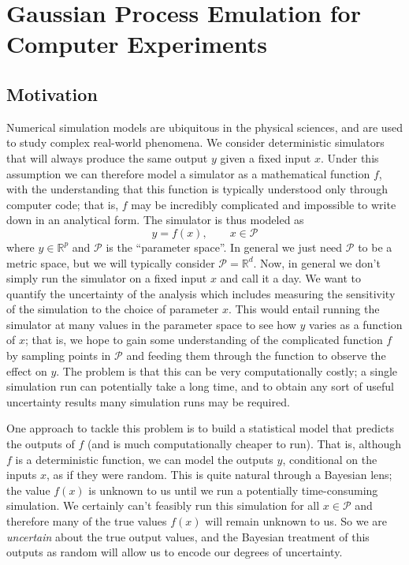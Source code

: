 \documentclass[12pt]{article}
\newcommand{\R}{\mathcal{R}}
\def\R{\mathbb{R}}
\begin{document}
\section{Gaussian Process Emulation for Computer Experiments}

\subsection{Motivation}
Numerical simulation models are ubiquitous in the physical sciences, and are used to study complex real-world phenomena. We consider 
deterministic simulators that will always produce the same output $y$ given a fixed input $x$. Under this assumption we can therefore model 
a simulator as a mathematical function $f$, with the understanding that this function is typically understood only through computer code; that is, 
$f$ may be incredibly complicated and impossible to write down in an analytical form. The simulator is thus modeled as 
\[y = f(x), \qquad x \in \mathcal{P}\]
where $y \in \R^p$ and $\mathcal{P}$ is the ``parameter space''. In general we just need $\mathcal{P}$ to be a metric space, but we will typically 
consider $\mathcal{P} = \R^d$. Now, in general we don't simply run the simulator on a fixed input $x$ and call it a day. We want to quantify the uncertainty 
of the analysis which includes measuring the sensitivity of the simulation to the choice of parameter $x$. This would entail running the simulator at many 
values in the parameter space to see how $y$ varies as a function of $x$; that is, we hope to gain some understanding of the complicated function $f$ by 
sampling points in $\mathcal{P}$ and feeding them through the function to observe the effect on $y$. The problem is that this can be very computationally costly; 
a single simulation run can potentially take a long time, and to obtain any sort of useful uncertainty results many simulation runs may be required. 

One approach to tackle this problem is to build a statistical model that predicts the outputs of $f$ (and is much computationally cheaper to run). That is, although $f$ 
is a deterministic function, we can model the outputs $y$, conditional on the inputs $x$, as if they were random. This is quite natural through a Bayesian lens; the value 
$f(x)$ is unknown to us until we run a potentially time-consuming simulation. We certainly can't feasibly run this simulation for all $x \in \mathcal{P}$ and therefore many 
of the true values $f(x)$ will remain unknown to us. So we are \textit{uncertain} about the true output values, and the Bayesian treatment of this outputs as random will
allow us to encode our degrees of uncertainty. 
\end{document}
